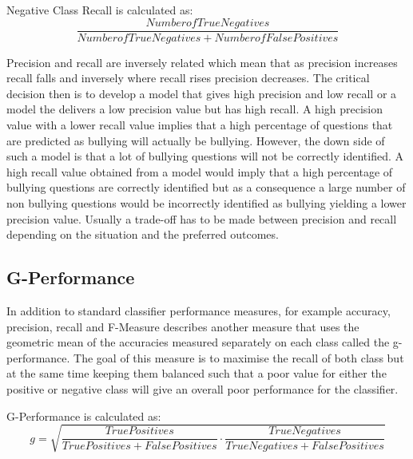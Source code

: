 Negative Class Recall is calculated as:
\begin{equation}
     \frac{Number of True Negatives}{Number of True Negatives + Number of False Positives}
\end{equation} 


Precision and recall are inversely related which mean that as precision increases recall falls and inversely where recall rises precision decreases. The critical decision then is to develop a model that gives high precision and low recall or a model the delivers a low precision value but has high recall. A high precision value with a lower recall value implies that a high percentage of questions that are predicted as bullying will actually be bullying. However, the down side of such a model is that a lot of bullying questions will not be correctly identified. A high recall value obtained from a model would imply that a high percentage of bullying questions are correctly identified but as a consequence a large number of non bullying questions would be incorrectly identified as bullying yielding a lower precision value. Usually a trade-off has to be made between precision and recall depending on the situation and the preferred outcomes.

\subsection{G-Performance}
In addition to standard classifier performance measures, for example accuracy, precision, recall and F-Measure \citeauthor{kubat_addressing_1997} describes another measure that uses the geometric mean of the accuracies measured separately on each class called the g-performance. The goal of this measure is to maximise the recall of both class but at the same time keeping them balanced such that a poor value for either the positive or negative class will give an overall poor performance for the classifier.

G-Performance is calculated as:
\begin{equation}
     g =\sqrt{\frac{True Positives}{True Positives + False Positives} \cdot \frac{True Negatives}{True Negatives + False Positives}}
\end{equation} 